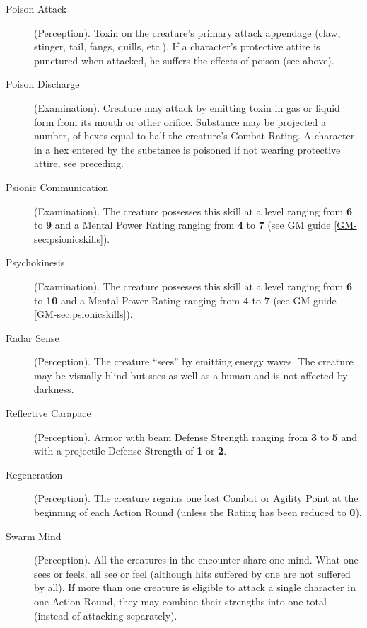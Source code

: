 \begin{description}
\item[Poison Attack] (Perception). Toxin on the creature's primary
  attack appendage (claw, stinger, tail, fangs, quills, etc.). If a
  character's protective attire is punctured when attacked, he suffers
  the effects of poison (see above).

\item[Poison Discharge] (Examination). Creature may attack by
  emitting toxin in gas or liquid form from its mouth or other orifice.
  Substance may be projected a number, of hexes equal to half the
  creature's Combat Rating. A character in a hex entered by the
  substance is poisoned if not wearing protective attire, see preceding.
  
\item[Psionic Communication] (Examination). The creature possesses
  this skill at a level ranging from \textbf{6} to \textbf{9} and a
  Mental Power Rating ranging from \textbf{4} to \textbf{7} (see GM
  guide \ref{GM-sec:psionicskills}).

\item[Psychokinesis] (Examination). The creature possesses this
  skill at a level ranging from \textbf{6} to \textbf{10} and a Mental
  Power Rating ranging from \textbf{4} to \textbf{7} (see GM guide
  \ref{GM-sec:psionicskills}).

\item[Radar Sense] (Perception). The creature ``sees'' by emitting
  energy waves. The creature may be visually blind but sees as well as a
  human and is not affected by darkness.

\item[Reflective Carapace] (Perception). Armor with beam Defense
  Strength ranging from \textbf{3} to \textbf{5} and with a projectile Defense Strength of
  \textbf{1} or \textbf{2}.

\item[Regeneration] (Perception). The creature regains one lost
  Combat or Agility Point at the beginning of each Action Round (unless
  the Rating has been reduced to \textbf{0}).

\item[Swarm Mind] (Perception). All the creatures in the encounter
  share one mind. What one sees or feels, all see or feel (although hits
  suffered by one are not suffered by all). If more than one creature is
  eligible to attack a single character in one Action Round, they may
  combine their strengths into one total (instead of attacking
  separately).


\end{description}
